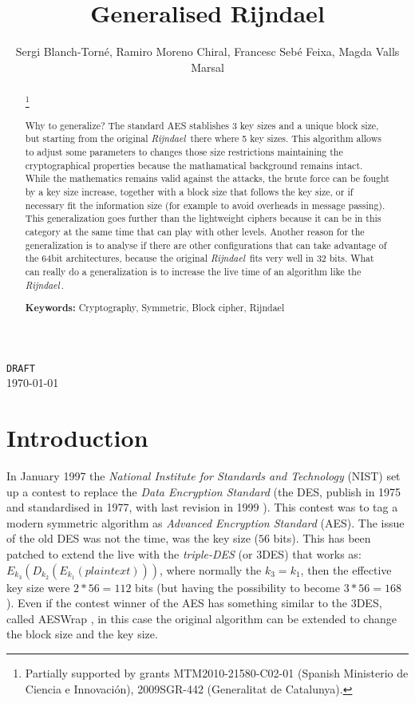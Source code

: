 \documentclass[10pt,a4paper,twoside]{llncs}
\title{Generalised Rijndael}
\author{Sergi Blanch-Torn\'e\inst{1}, Ramiro Moreno Chiral\inst{2}, Francesc Seb\'e Feixa\inst{2}, Magda Valls Marsal\inst{2}}
\institute{
 Escola Polit\`ecnica Superior, Universitat de Lleida. Spain.\\
 \email{\tt sblanch@alumnes.udl.es}
 \and 
 Departament de Matem\`atica. Universitat de Lleida. Spain.\\
 \email{\tt \{ramiro,fsebe,magda\}@matematica.udl.es}
 }
\newcommand{\rijndael}{\emph{Rijndael}}
\begin{document}
\maketitle
\begin{center}
 {\tt DRAFT}\\
 \today\\
\end{center}

\begin{abstract}\footnote{Partially supported by grants MTM2010-21580-C02-01 (Spanish Ministerio de Ciencia e Innovaci\'on), 2009SGR-442 (Generalitat de Catalunya).}

Why to generalize? The standard AES stablishes 3 key sizes and a unique block size, but starting from the original \rijndael\, there where 5 key sizes. This algorithm allows to adjust some parameters to changes those size restrictions maintaining the cryptographical properties because the mathamatical background remains intact. While the mathematics remains valid against the attacks, the brute force can be fought by a key size increase, together with a block size that follows the key size, or if necessary fit the information size (for example to avoid overheads in message passing). This generalization goes further than the lightweight ciphers because it can be in this category at the same time that can play with other levels.
Another reason for the generalization is to analyse if there are other configurations that can take advantage of the $64$bit architectures, because the original \rijndael\, fits very well in $32$ bits.
What can really do a generalization is to increase the live time of an algorithm like the \rijndael\,.

{\bf Keywords:} Cryptography, Symmetric, Block cipher, Rijndael
\end{abstract}

\section{Introduction}\label{sec:intro}

In January 1997 the \emph{National Institute for Standards and Technology} (NIST) set up a contest to replace the \emph{Data Encryption Standard} (the DES, publish in 1975 and standardised in 1977, with last revision in 1999 \cite{FIPS_46-3}). This contest was to tag a modern symmetric algorithm as \emph{Advanced Encryption Standard} (AES). The issue of the old DES was not the time, was the key size ($56$ bits). This has been patched to extend the live with the \emph{triple-DES} (or 3DES) that works as: $ E_{k_3}(D_{k_2}(E_{k_1}(plaintext)))$, where normally the $k_3=k_1$, then the effective key size were $2*56=112$ bits (but having the possibility to become $3*56=168$). Even if the contest winner of the AES has something similar to the 3DES, called AESWrap \cite{rfc3394}, in this case the original algorithm can be extended to change the block size and the key size.
\end{document}
